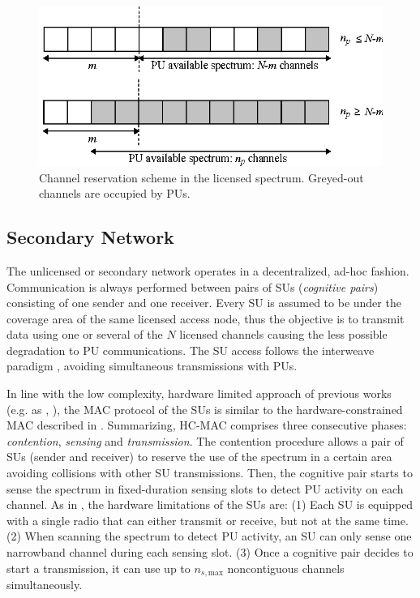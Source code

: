 \begin{figure}[ht]
\centering
\includegraphics[scale=0.9]{channelReservation.eps}
\caption[]{Channel reservation scheme in the licensed spectrum. Greyed-out channels are occupied by PUs.}\label{BR_fig_allocation}
\end{figure}

\subsection{Secondary Network}\label{secondarynetwork}
The unlicensed or secondary network operates in a decentralized, ad-hoc fashion. 
Communication is always performed between pairs of SUs (\textit{cognitive pairs}) consisting of one sender and one receiver.
Every SU is assumed to be under the coverage area of the same licensed access node, thus the objective is to transmit data using one or several of the $N$ licensed channels causing the less possible degradation to PU communications. The SU access follows the interweave paradigm \cite{ref:BookCognitive}, avoiding simultaneous transmissions with PUs.

In line with the low complexity, hardware limited approach of previous works (e.g. \cite{ref:comparativaMAC} as \cite{ref:HCMAC}, \cite{ref:lowComplexity}), the MAC protocol of the SUs is similar to the hardware-constrained MAC described in \cite{ref:HCMAC}.
Summarizing, HC-MAC comprises three consecutive phases: \textit{contention}, \textit{sensing} and \textit{transmission}.
The contention procedure allows a pair of SUs (sender and receiver) to reserve the use of the spectrum in a certain area avoiding collisions with other SU transmissions.
Then, the cognitive pair starts to sense the spectrum in fixed-duration sensing slots to detect PU activity on each channel. 
As in \cite{ref:HCMAC}, the hardware limitations of the SUs are:
(1) Each SU is equipped with a single radio that can either transmit or receive, but not at the same time.
(2) When scanning the spectrum to detect PU activity, an SU can only sense one narrowband channel during each sensing slot.
(3) Once a cognitive pair decides to start a transmission, it can use up to $n_{s,\text{max}}$ noncontiguous channels simultaneously. 

